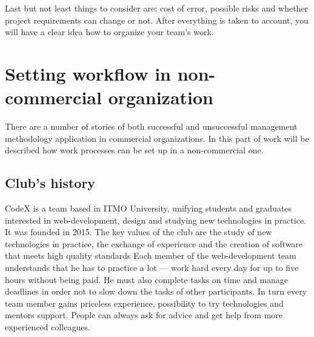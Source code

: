 \documentclass[conference]{IEEEtran}
\begin{document}
    Last but not least things to consider are: cost of error, possible risks and whether project requirements can change or not.
    After everything is taken to account, you will have a clear idea how to organize your team's work.

    \section{Setting workflow in non-commercial organization}\label{sec:setting-workflow-in-non-commercial-organization}
    There are a number of stories of both successful and unsuccessful management methodology application in commercial organizations.
    In this part of work will be described how work processes can be set up in a non-commercial one.
    \subsection{Club's history}\label{subsec:club's-history}
    CodeX is a team based in ITMO University, unifying students and graduates interested in web-development, design and studying new technologies in practice.
    It was founded in 2015.
    The key values of the club are the study of new technologies in practice, the exchange of experience and the creation of software that meets high quality standards
    Each member of the web-development team understands that he has to practice a lot — work hard every day for up to five hours without being paid.
    He must also complete tasks on time and manage deadlines in order not to slow down the tasks of other participants.
    In turn every team member gains priceless experience, possibility to try technologies and mentors support.
    People can always ask for advice and get help from more experienced colleagues.
\end{document}

